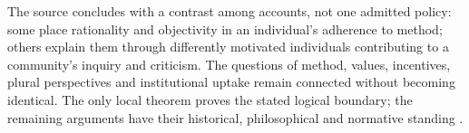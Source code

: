 The source concludes with a contrast among accounts, not one admitted
policy: some place rationality and objectivity in an individual's
adherence to method; others explain them through differently motivated
individuals contributing to a community's inquiry and criticism. The
questions of method, values, incentives, plural perspectives and
institutional uptake remain connected without becoming identical.
The only local theorem proves the stated logical boundary; the
remaining arguments have their historical, philosophical and
normative standing \parencite[p.~753]{AndersenAndersen2021Scientific}.


